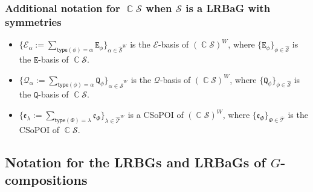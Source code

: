 \documentclass[11pt, oneside, reqno]{amsart}
\theoremstyle{definition}
\numberwithin{equation}{section}
\DeclareMathOperator{\C}{\mathbb{C}}
\def \SS{{\mathcal{S}}}
\def \TT{{\mathcal{T}}}
\def \kk{\C}
\def \ee{{\mathfrak{e}}}
\def \wh{\widehat}
\def \type{\mathsf{type}}
\newcommand{\B}[1]{\mathtt{#1}} 			%
\begin{document}
\subsubsection*{Additional notation for $\kk \SS$ when $\SS$ is a LRBaG with symmetries}

\begin{itemize}[wide]
    \item
        $\{ \mathcal{E}_\alpha := \sum_{\type(\phi) = \alpha} \B{E}_{\phi} \}_{\alpha \in \wh{\SS}^W}$
        is the $\mathcal{E}$-basis of $(\kk \SS)^W$,
        where $\{\B{E}_{\phi} \}_{\phi \in \wh{\SS}}$ is the $\B{E}$-basis of $\kk \SS$.

    \item
        $\{ \mathcal{Q}_\alpha := \sum_{\type(\phi) = \alpha} \B{Q}_{\phi} \}_{\alpha \in \wh{\SS}^W}$
        is the $\mathcal{Q}$-basis of $(\kk \SS)^W$,
        where $\{\B{Q}_{\phi} \}_{\phi \in \wh{\SS}}$ is the $\B{Q}$-basis of $\kk \SS$.

    \item
        $\{\ee_{\lambda} := \sum_{\type(\Phi) = \lambda} \ee_{\Phi}\}_{\lambda \in \wh{\TT}^W}$
        is a CSoPOI of $(\kk \SS)^W$,
        where $\{\ee_{\Phi} \}_{\Phi \in \wh{\TT}}$ is the CSoPOI of $\kk \SS$.
\end{itemize}

\subsection*{Notation for the LRBGs and LRBaGs of $G$-compositions}
\end{document}
